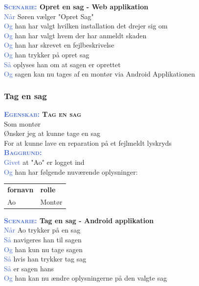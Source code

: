 \textbf{\textsc{\textcolor{RoyalBlue}{Scenarie:}} Opret en sag - Web applikation}\\
\textcolor{RoyalBlue}{Når} Søren vælger "Opret Sag"\\
\textcolor{RoyalBlue}{Og} han har valgt hvilken installation det drejer sig om\\
\textcolor{RoyalBlue}{Og} han har valgt hvem der har anmeldt skaden\\
\textcolor{RoyalBlue}{Og} han har skrevet en fejlbeskrivelse \\
\textcolor{RoyalBlue}{Og} han trykker på opret sag \\
\textcolor{RoyalBlue}{Så} oplyses han om at sagen er oprettet\\
\textcolor{RoyalBlue}{Og} sagen kan nu tages af en montør via Android 
Applikationen\\


\subsubsection{Tag en sag}
\textbf{\textsc{\textcolor{RoyalBlue}{Egenskab:} Tag en sag}}\\
Som montør\\
Ønsker jeg at kunne tage en sag\\
For at kunne lave en reparation på et fejlmeldt lyskryds\\

\textsc{\textcolor{RoyalBlue}{\textbf{Baggrund:}}}\\
\textcolor{RoyalBlue}{Givet} at "Ao" er logget ind\\
\textcolor{RoyalBlue}{Og} han har følgende nuværende oplysninger:\\
\begin{tabular}{| l | l |}
	\textbf{fornavn} & \textbf{rolle} \\
	Ao & Montør\\
\end{tabular}
\newline \newline

\textbf{\textsc{\textcolor{RoyalBlue}{Scenarie:}} Tag en sag - Android applikation}\\
\textcolor{RoyalBlue}{Når} Ao trykker på en sag\\
\textcolor{RoyalBlue}{Så} navigeres han til sagen\\
\textcolor{RoyalBlue}{Og} han kun nu tage sagen\\
\textcolor{RoyalBlue}{Så} hvis han trykker tag sag\\
\textcolor{RoyalBlue}{Så} er sagen hans\\
\textcolor{RoyalBlue}{Og} han kan nu ændre oplysningerne på den valgte sag\\
\clearpage

